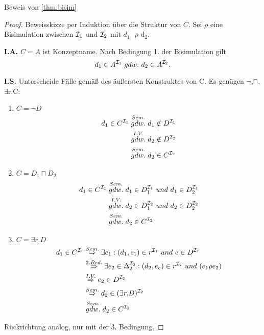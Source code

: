 \begin{tafel} Beweis von \autoref{thm:bisim}
\begin{proof}
Beweisskizze per Induktion über die Struktur von $C$. Sei $\rho$ eine
Bisimulation zwischen $\mathcal{I}_1$ und $\mathcal{I}_2$ mit
$d_1\text{\ $\rho$}\text{\ d}_2$.

\textbf{I.A.} $C = A$ ist Konzeptname. Nach Bedingung 1. der
Bisimulation gilt
\[ d_1 \in A^{\mathcal{I}_1}\ gdw.\ d_2 \in A^{\mathcal{I}_2}. \]


\textbf{I.S.} Unterscheide Fälle gemäß des äußersten Konstruktes von C.
Es genügen $\neg$,$\sqcap$, $\exists\text{r.C}$:

\begin{enumerate}
\item
  $C = \neg D$
    \begin{align*}
        d_1 \in C^{\mathcal{I}_1} &\stackrel{Sem.}{gdw.} d_1 \notin D^{\mathcal{I}_1}\\
        &\stackrel{I.V.}{gdw.} d_2 \notin D^{\mathcal{I}_2} \\
        &\stackrel{Sem.}{gdw.} d_2 \in C^{\mathcal{I}_2}
    \end{align*}
\item $C = D_1 \sqcap D_2$
  \begin{align*}
d_1 \in C^{\MI_1} &\stackrel{Sem.}{gdw.} d_1 \in D_1^{\MI_1}\ und\ d_1 \in D_2^{\MI_1}\\
&\stackrel{I.V.}{gdw.} d_2 \in D_1^{\MI_2}\ und\ d_2 \in D_2^{\MI_2} \\
&\stackrel{Sem.}{gdw.} d_2 \in C^{\MI_2}
\end{align*}

\item $C = \exists r.D$
  \begin{align*}
d_1 \in C^{\mathcal{I}_1} &\stackrel{Sem.}{\Rightarrow} \exists e_1 : (d_1,e_1) \in r^{\mathcal{I}_1}\ und\ e \in D^{\mathcal{I}_1}\\
&\stackrel{2.Bed.}{\Rightarrow} \exists e_2 \in \Delta_2^{\mathcal{I}_2}: (d_2,e_e) \in r^{\mathcal{I}_2}\ und\ (e_1 \rho e_2) \\
&\stackrel{I.V.}{\Rightarrow} e_2 \in D^{\mathcal{I}_2} \\
&\stackrel{Sem.}{\Rightarrow} d_2 \in (\exists r.D)^{\mathcal{I}_2} \\
&\stackrel{Sem.}{gdw.} d_2 \in C^{\mathcal{I}_2}
\end{align*}
\end{enumerate}
Rückrichtung analog, nur mit der 3. Bedingung.
\end{proof}
\end{tafel}

